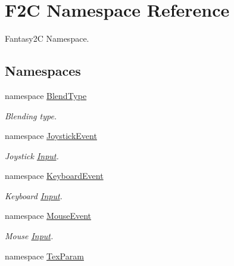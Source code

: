 \hypertarget{namespace_f2_c}{
\section{F2C Namespace Reference}
\label{namespace_f2_c}
}


Fantasy2C Namespace.  


\subsection*{Namespaces}
\begin{DoxyCompactItemize}
\item 
namespace \hyperlink{namespace_f2_c_1_1_blend_type}{BlendType}


\begin{DoxyCompactList}\small\item\em Blending type. \item\end{DoxyCompactList}

\item 
namespace \hyperlink{namespace_f2_c_1_1_joystick_event}{JoystickEvent}


\begin{DoxyCompactList}\small\item\em Joystick \hyperlink{class_f2_c_1_1_input}{Input}. \item\end{DoxyCompactList}

\item 
namespace \hyperlink{namespace_f2_c_1_1_keyboard_event}{KeyboardEvent}


\begin{DoxyCompactList}\small\item\em Keyboard \hyperlink{class_f2_c_1_1_input}{Input}. \item\end{DoxyCompactList}

\item 
namespace \hyperlink{namespace_f2_c_1_1_mouse_event}{MouseEvent}


\begin{DoxyCompactList}\small\item\em Mouse \hyperlink{class_f2_c_1_1_input}{Input}. \item\end{DoxyCompactList}

\item 
namespace \hyperlink{namespace_f2_c_1_1_tex_param}{TexParam}



\end{DoxyCompactItemize}
